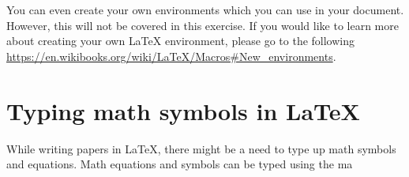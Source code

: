 \documentclass{article}            %
\begin{document}
You can even create your own environments which you can use in your document. However, this will not be covered in this exercise. If you would like to learn more about creating your own {\LaTeX} environment, please go to the following \url{https://en.wikibooks.org/wiki/LaTeX/Macros#New_environments}.

\section*{Typing math symbols in {\LaTeX}}
While writing papers in {\LaTeX}, there might be a need to type up math symbols and equations. Math equations and symbols can be typed using the ma
\end{document}
